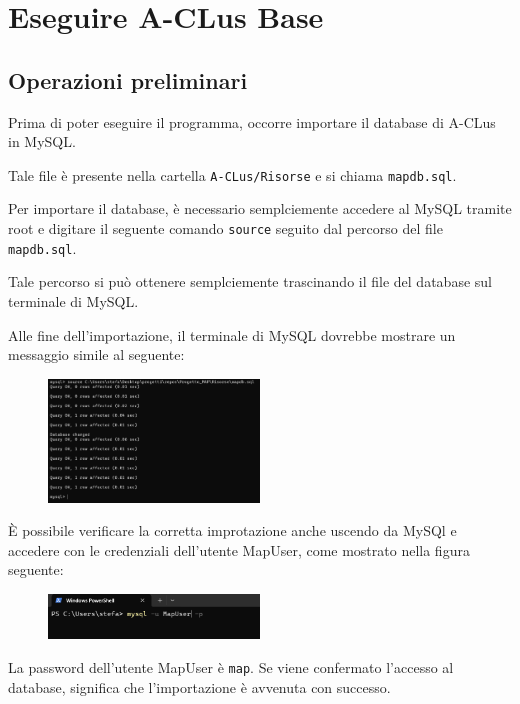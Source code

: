 \section{Eseguire A-CLus Base}

\subsection*{Operazioni preliminari}

Prima di poter eseguire il programma, occorre importare il database di A-CLus in MySQL. 

Tale file è presente nella cartella \texttt{A-CLus/Risorse} e si chiama \texttt{mapdb.sql}. 

Per importare il database, è necessario semplciemente accedere al MySQL tramite root e digitare il seguente comando \texttt{source} seguito dal percorso del file \texttt{mapdb.sql}. 

Tale percorso si può ottenere semplciemente trascinando il file del database sul terminale di MySQL.

Alle fine dell'importazione, il terminale di MySQL dovrebbe mostrare un messaggio simile al seguente:

\begin{figure}[h!]
    \centering
    \includegraphics[width=0.5\textwidth]{images/import mysql.png}
\end{figure}

È possibile verificare la corretta improtazione anche uscendo da MySQl e accedere con le credenziali dell'utente MapUser, come mostrato nella figura seguente:

\begin{figure}[h!]
    \centering
    \includegraphics[width=0.5\textwidth]{images/import mapdb.png}
\end{figure}

La password dell'utente MapUser è \texttt{map}. Se viene confermato l'accesso al database, significa che l'importazione è avvenuta con successo. 

